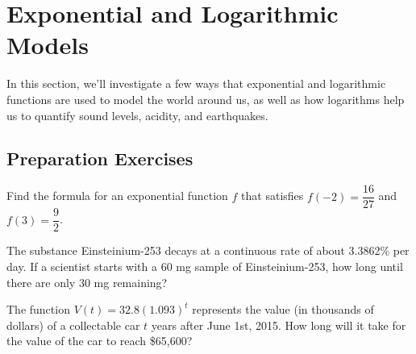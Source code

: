 
\section{Exponential and Logarithmic Models} \label{exponential-and-logarithmic-models}

In this section, we'll investigate a few ways that exponential and logarithmic functions are used to model the world around us, as well as how logarithms help us to quantify sound levels, acidity, and earthquakes.\\[0.5em]


\subsection*{Preparation Exercises} \label{prep-exponential-and-logarithmic-models}


\begin{myPrep}
Find the formula for an exponential function $f$ that satisfies $f(-2) = \dfrac{16}{27}$ and $f(3)=\dfrac{9}{2}$.	
\vfill
\end{myPrep}

\begin{myPrep}
The substance Einsteinium-253 decays at a continuous rate of about 3.3862\% per day.  If a scientist starts with a 60 mg sample of Einsteinium-253, how long until there are only 30 mg remaining?
\vfill
\end{myPrep}

\begin{myPrep}
The function $V(t) = 32.8(1.093)^t$ represents the value (in thousands of dollars) of a collectable car $t$ years after June 1st, 2015.  How long will it take for the value of the car to reach \$65,600?
\vfill
\end{myPrep}



